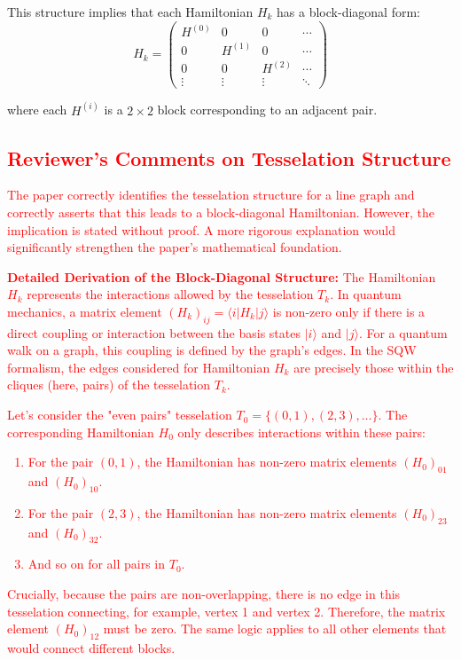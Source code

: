 \documentclass[11pt,a4paper]{article}
\begin{document}
This structure implies that each Hamiltonian $H_k$ has a block-diagonal form:
\begin{equation}
H_k = \begin{pmatrix}
H^{(0)} & 0 & 0 & \cdots \\
0 & H^{(1)} & 0 & \cdots \\
0 & 0 & H^{(2)} & \cdots \\
\vdots & \vdots & \vdots & \ddots
\end{pmatrix}
\end{equation}

where each $H^{(i)}$ is a $2\times2$ block corresponding to an adjacent pair.

\textcolor{red}{
\subsection*{Reviewer's Comments on Tesselation Structure}
The paper correctly identifies the tesselation structure for a line graph and correctly asserts that this leads to a block-diagonal Hamiltonian. However, the implication is stated without proof. A more rigorous explanation would significantly strengthen the paper's mathematical foundation.

\textbf{Detailed Derivation of the Block-Diagonal Structure:}
The Hamiltonian $H_k$ represents the interactions allowed by the tesselation $T_k$. In quantum mechanics, a matrix element $(H_k)_{ij} = \langle i | H_k | j \rangle$ is non-zero only if there is a direct coupling or interaction between the basis states $|i\rangle$ and $|j\rangle$. For a quantum walk on a graph, this coupling is defined by the graph's edges. In the SQW formalism, the edges considered for Hamiltonian $H_k$ are precisely those within the cliques (here, pairs) of the tesselation $T_k$.

Let's consider the "even pairs" tesselation $T_0 = \{(0,1), (2,3), \ldots\}$. The corresponding Hamiltonian $H_0$ only describes interactions within these pairs:
\begin{enumerate}
\item For the pair $(0,1)$, the Hamiltonian has non-zero matrix elements $(H_0)_{01}$ and $(H_0)_{10}$.
\item For the pair $(2,3)$, the Hamiltonian has non-zero matrix elements $(H_0)_{23}$ and $(H_0)_{32}$.
\item And so on for all pairs in $T_0$.
\end{enumerate}

Crucially, because the pairs are non-overlapping, there is no edge in this tesselation connecting, for example, vertex 1 and vertex 2. Therefore, the matrix element $(H_0)_{12}$ must be zero. The same logic applies to all other elements that would connect different blocks.

}
\end{document}
